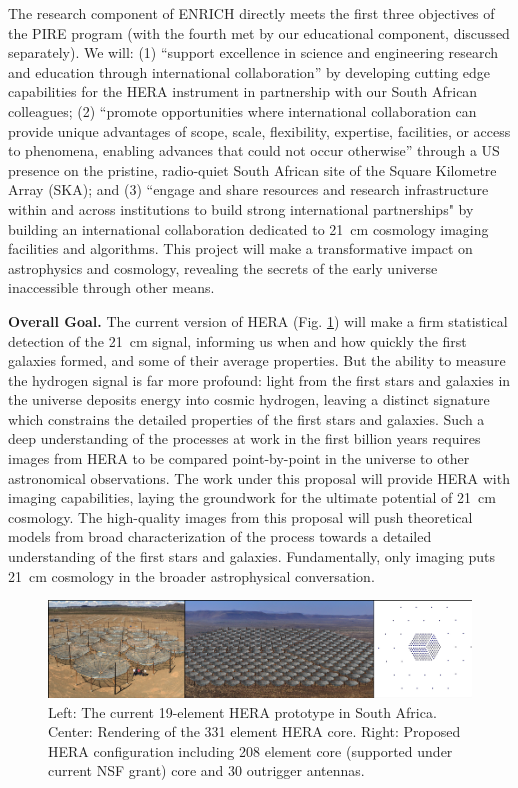 \documentclass[preprint,11pt]{aastex}
\begin{document}
The research component of ENRICH directly meets the first three objectives of the PIRE program (with the fourth met by our educational component, discussed separately).  We will: (1) ``support excellence in science and engineering research and education through international collaboration'' by developing cutting edge capabilities for the HERA instrument in partnership with our South African colleagues; (2) ``promote opportunities where international collaboration can provide unique advantages of scope, scale, flexibility, expertise, facilities, or access to phenomena, enabling advances that could not occur otherwise'' through a US presence on the pristine, radio-quiet South African site of the Square Kilometre Array (SKA); and (3) ``engage and share resources and research infrastructure within and across institutions to build strong international partnerships" by building an international collaboration dedicated to 21\, cm cosmology imaging facilities and algorithms.  This project will make a transformative impact on astrophysics and cosmology, revealing the secrets of the early universe inaccessible through other means.   

\vspace{8pt}
\textbf{Overall Goal.} The current version of HERA (Fig. \ref{fig:research}) will make a firm statistical detection of the 21\, cm signal, informing us when and how quickly the first galaxies formed, and some of their average properties.  But the ability to measure the hydrogen signal is far more profound: light from the first stars and galaxies in the universe deposits energy into cosmic hydrogen, leaving a distinct signature which constrains the detailed properties of the first stars and galaxies.  Such a deep understanding of the processes at work in the first billion years requires images from HERA to be compared point-by-point in the universe to other astronomical observations.  The work under this proposal will provide HERA with imaging capabilities, laying the groundwork for the ultimate potential of 21\, cm cosmology.  The high-quality images from this proposal will push theoretical models from broad characterization of the process towards a detailed understanding of the first stars and galaxies.  Fundamentally, only imaging puts 21\, cm cosmology in the broader astrophysical conversation.  

\begin{figure}[!ht]
\centering
\includegraphics{research_fig.pdf}
\caption{Left: The current 19-element HERA prototype in South Africa.  Center: Rendering of the 331 element HERA core. Right: Proposed HERA configuration including 208 element core (supported under current NSF grant) core and 30 outrigger antennas.}
\label{fig:research}
\vspace{-0.2in}
\end{figure}
\end{document}
